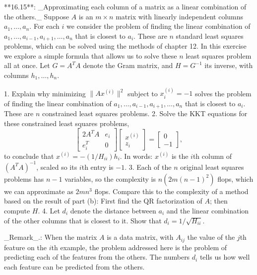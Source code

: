 

**16.15**: _Approximating each column of a matrix as a linear combination of the others._ Suppose \(A\) is an \(m\times n\) matrix with linearly independent columns \(a_{1},\ldots,a_{n}\). For each \(i\) we consider the problem of finding the linear combination of \(a_{1},\ldots,a_{i-1},a_{i+1},\ldots,a_{n}\) that is closest to \(a_{i}\). These are \(n\) standard least squares problems, which can be solved using the methods of chapter 12. In this exercise we explore a simple formula that allows us to solve these \(n\) least squares problem all at once. Let \(G=A^{T}A\) denote the Gram matrix, and \(H=G^{-1}\) its inverse, with columns \(h_{1},\ldots,h_{n}\).

1. Explain why minimizing \(\|Ax^{(i)}\|^{2}\) subject to \(x^{(i)}_{i}=-1\) solves the problem of finding the linear combination of \(a_{1},\ldots,a_{i-1},a_{i+1},\ldots,a_{n}\) that is closest to \(a_{i}\). These are \(n\) constrained least squares problems.
2. Solve the KKT equations for these constrained least squares problems, \[\left[\begin{array}{cc}2A^{T}A&e_{i}\\ e_{i}^{T}&0\end{array}\right]\left[\begin{array}{c}x^{(i)}\\ z_{i}\end{array}\right]=\left[\begin{array}{c}0\\ -1\end{array}\right],\] to conclude that \(x^{(i)}=-(1/H_{ii})h_{i}\). In words: \(x^{(i)}\) is the \(i\)th column of \((A^{T}A)^{-1}\), scaled so its \(i\)th entry is \(-1\).
3. Each of the \(n\) original least squares problems has \(n-1\) variables, so the complexity is \(n(2m(n-1)^{2})\) flops, which we can approximate as \(2mn^{3}\) flops. Compare this to the complexity of a method based on the result of part (b): First find the QR factorization of \(A\); then compute \(H\).
4. Let \(d_{i}\) denote the distance between \(a_{i}\) and the linear combination of the other columns that is closest to it. Show that \(d_{i}=1/\sqrt{H_{ii}}\).

_Remark_.: When the matrix \(A\) is a data matrix, with \(A_{ij}\) the value of the \(j\)th feature on the \(i\)th example, the problem addressed here is the problem of predicting each of the features from the others. The numbers \(d_{i}\) tells us how well each feature can be predicted from the others.


